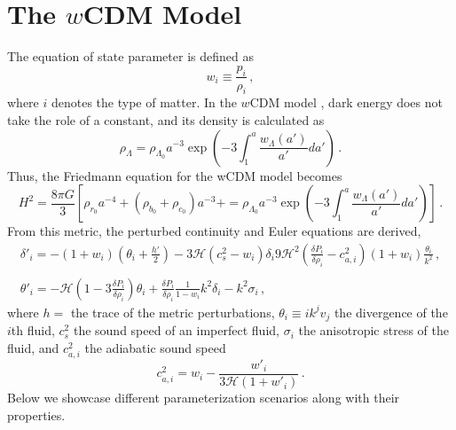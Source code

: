 \documentclass{book}
\begin{document}
	\section{The $w$CDM Model}
	The equation of state parameter is defined as
	\begin{equation}
		w_i\equiv\frac{p_i}{\rho_i} \, ,
	\end{equation}
	where $i$ denotes the type of matter. In the $w$CDM model \cite{sammut2025testingplanck2020desi}, dark energy does not take the role of a constant, and its density is calculated as
	\begin{equation}
		\rho_\Lambda=\rho_{\Lambda_0}a^{-3}\exp\left( -3 \int_{1}^{a} \frac{w_\Lambda(a')}{a'} da' \right) \, .
	\end{equation}
	Thus, the Friedmann equation for the wCDM model becomes
	\begin{equation}
		\label{wCDM_Friedmann_equation}
		H^2=\frac{8\pi G}{3}\left[ \rho_{r_0} a^{-4} + (\rho_{b_0} + \rho_{c_0})a^{-3} + =\rho_{\Lambda_0}a^{-3}\exp\left( -3 \int_{1}^{a} \frac{w_\Lambda(a')}{a'} da' \right) \right] \, .
	\end{equation}
	From this metric, the perturbed continuity and Euler equations are derived,
	\begin{equation}
		\begin{array}{c}
			\delta'_i = -(1+w_i)\left( \theta_i + \frac{h'}{2} \right) - 3\mathcal{H} (c^2_s - w_i)\delta_i 9\mathcal{H}^2\left( \frac{\delta P_i}{\delta \rho_i} - c^2_{a,i} \right) (1+w_i)\frac{\theta_i}{k^2} \, , \\ \, \\ 
			\theta'_i=-\mathcal{H}\left( 1-3\frac{\delta P_i}{\delta \rho_i}  \right)\theta_i +\frac{\delta P_i}{\delta \rho_i} \frac{1}{1-w_i}k^2 \delta_i-k^2\sigma_i \, ,
		\end{array}
	\end{equation}
	where $h=$ the trace of the metric perturbations, $\theta_i\equiv ik^j v_j$ the divergence of the $i$th fluid, $c^2_s$ the sound speed of an imperfect fluid, $\sigma_i$ the anisotropic stress of the fluid,	and $c^2_{a,i}$ the adiabatic sound speed
	\begin{equation}
		c^2_{a,i}=w_i-\frac{w'_i}{3\mathcal{H}(1+w'_i)} \, .
	\end{equation}
	Below we showcase different parameterization scenarios along with their properties.
\end{document}
